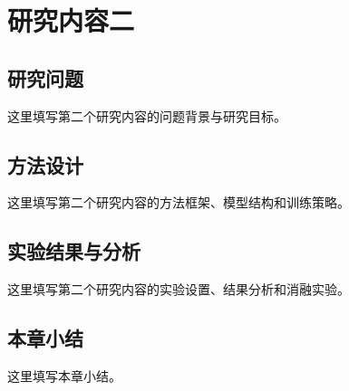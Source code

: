 \chapter{研究内容二}

\section{研究问题}

这里填写第二个研究内容的问题背景与研究目标。

\section{方法设计}

这里填写第二个研究内容的方法框架、模型结构和训练策略。

\section{实验结果与分析}

这里填写第二个研究内容的实验设置、结果分析和消融实验。

\section{本章小结}

这里填写本章小结。
